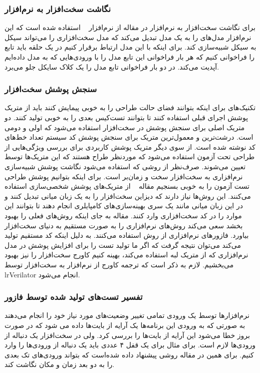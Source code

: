 \documentclass[conference]{IEEEtran}
\begin{document}
\subsubsection{نگاشت سخت‌افزار به نرم‌افزار}
برای نگاشت سخت‌افزار به نرم‌افزار در مقاله
\cite{hf}
از نرم‌افزار
~\cite{ver}
استفاده شده است که این نرم‌افزار مدل‌های
را به یک مدل
تبدیل می‌کند که مدل سخت‌افزاری را می‌تواند سیکل به سیکل شبیه‌سازی کند.
برای اینکه با این مدل ارتباط برقرار کنیم در یک حلقه باید تابع
را فراخوانی کنیم که هر بار فراخوانی این تابع مدل‌ را با ورودی‌هایی که به مدل داده‌ایم آپدیت می‌کند.
در دو بار فراخوانی تابع
مدل را یک کلاک سایکل جلو می‌برد.
\subsubsection{سنجش پوشش سخت‌افزار}
تکنیک‌های
برای اینکه بتوانند فضای حالت طراحی را به خوبی پیمایش کنند باید از متریک پوشش اجرای قبلی استفاده کنند
تا بتوانند تست‌کیس بعدی را به خوبی تولید کنند.
دو متریک اصلی برای سنجش پوشش در سخت‌افزار استفاده می‌شود که اولی
و دومی
است.
درشت‌ترین و معمول‌ترین متریک برای سنجش پوشش کد سیستم تعداد خط‌های کد نوشته شده است.
از سوی دیگر متریک
پوشش کاربردی برای بررسی ویژگی‌هایی از طراحی تحت آزمون استفاده می‌شود که موردنظر طراح هستند
که این متریک‌ها توسط
تعیین می‌شوند.
صرف‌نظر از روشی که استفاده می‌شود نگاشت پوشش شبیه‌سازی نرم‌افزاری به سخت‌افزار
سخت و زمان‌بر است.
\cite{slow}
برای اینکه بتوانیم پوشش طراحی تست آزمون را به خوبی بسنجیم مقاله
~\cite{rf}
از متریک‌های پوشش شخصی‌سازی استفاده می‌کنند.
این روش‌ها نیاز دارند که دیزاین سخت‌افزار را به یک زبان میانی تبدیل کنند
و در این زبان میانی مانند
یک سری بهینه‌سازی‌های کامپایلری انجام دهند تا بتوانند این موارد را در کد سخت‌افزاری وارد کنند.
مقاله
\cite{hf}
به جای اینکه روش‌های فعلی
را بهبود بخشد سعی می‌کند روش‌های نرم‌افزاری را به صورت مستقیم به دنیای سخت‌افزار بیاورد.
فازور‌های نرم‌افزاری از روش
استفاده می‌کنند.
به دلیل اینکه
کد
مستقیم تولید می‌کند می‌توان نتیجه گرفت که اگر ما تولید تست را برای افزایش
پوشش در مدل نرم‌افزاری که از متریک لبه استفاده می‌کند، بهینه کنیم کاورج سخت‌‌افزار را نیز بهبود می‌بخشیم.
لازم به ذکر است که ترجمه کاورج از نرم‌افزار به سخت‌افزار توسط
lr{Verilator}
انجام می‌شود.
\subsubsection{تفسیر تست‌های تولید شده توسط فازور}
نرم‌افزارها توسط یک ورودی تمامی تغییر وضعیت‌های مورد نیاز خود را انجام می‌دهند
به صورتی که به ورودی این برنامه‌ها یک آرایه از بایت‌ها داده می شود که در صورت بروز خطا
می‌شود این آرایه از بایت‌ها را بررسی کرد.
ولی در سخت‌افزار یک دنباله از ورودی‌ها لازم است.
برای مثال برای یک قفل ۴ عددی
باید یک دنباله از ورودی‌ها را وارد کنیم.
برای همین در مقاله
\cite{hf}
روشی پیشنهاد داده شده‌است که بتواند ورودی‌های تک بعدی را به دو بعد زمان و مکان
نگاشت کند.
\end{document}
